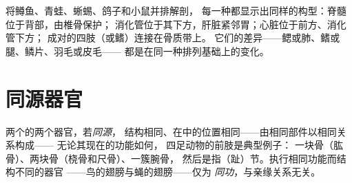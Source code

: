\begin{example}\label{ex:g10:common-ancestry:sameplan}
将鳟鱼、青蛙、蜥蜴、鸽子和小鼠并排解剖，
每一种都显示出同样的构型：脊髓位于背部，由椎骨保护；
消化管位于其下方，肝脏紧邻胃；心脏位于前方、消化管下方；
成对的四肢（或鳍）连接在骨质带上。
它们的差异——鳃或肺、鳍或腿、鳞片、羽毛或皮毛——
都是在同一种排列基础上的变化。
\end{example}

\section{同源器官}

\begin{definition}[同源]\label{def:g10:common-ancestry:homology}
两个的两个器官，若\emph{同源}，
结构相同、在中的位置相同——由相同部件以相同关系构成——
无论其现在的功能如何，
四足动物的前肢是典型例子：
一块骨（肱骨）、两块骨（桡骨和尺骨）、一簇腕骨，
然后是指（趾）节。执行相同功能而结构不同的器官
——鸟的翅膀与蝇的翅膀——仅为
\emph{同功}，与亲缘关系无关。
\end{definition}

